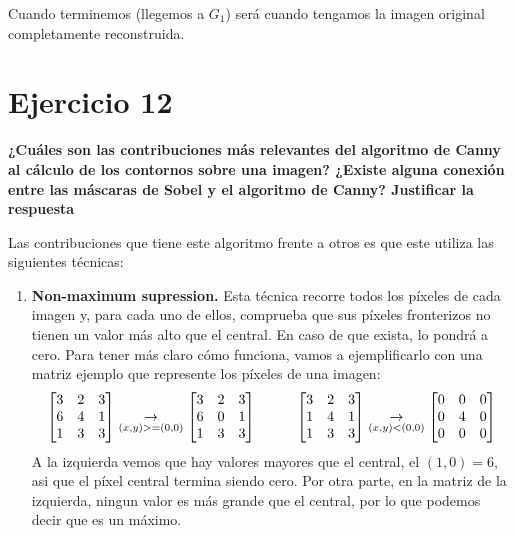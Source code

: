 \documentclass[11pt,a4paper]{article}
\begin{document}
Cuando terminemos (llegemos a $G_1$) será cuando tengamos la imagen original completamente reconstruida.

\section*{Ejercicio 12}

\textbf{¿Cuáles son las contribuciones más relevantes del algoritmo de Canny al cálculo de los contornos sobre una imagen? ¿Existe
alguna conexión entre las máscaras de Sobel y el algoritmo de Canny? Justificar la respuesta}

Las contribuciones que tiene este algoritmo frente a otros es que este utiliza las siguientes técnicas:
\begin{enumerate}
	\item \textbf{Non-maximum supression.} Esta técnica recorre todos los píxeles de cada imagen y, para cada uno de ellos, comprueba
	que sus píxeles fronterizos no tienen un valor más alto que el central. En caso de que exista, lo pondrá a cero. Para tener más
	claro cómo funciona, vamos a ejemplificarlo con una matriz ejemplo que represente los píxeles de una imagen:
	\begin{equation*}
		\begin{bmatrix}
		3& 2& 3\\ 
		6& 4& 1\\ 
		1& 3& 3
		\end{bmatrix}
		\underset{(x,y)>=(0,0)}{\rightarrow}
		\begin{bmatrix}
		3& 2& 3\\ 
		6& 0& 1\\ 
		1& 3& 3
		\end{bmatrix}
		\hspace{10mm}
		\begin{bmatrix}
		3& 2& 3\\ 
		1& 4& 1\\ 
		1& 3& 3
		\end{bmatrix}
		\underset{(x,y)<(0,0)}{\rightarrow}
		\begin{bmatrix}
		0& 0& 0\\ 
		0& 4& 0\\ 
		0& 0& 0
		\end{bmatrix}
	\end{equation*}
	A la izquierda vemos que hay valores mayores que el central, el $(1,0)=6$, asi que el píxel central termina siendo cero. Por otra parte, en
	la matriz de la izquierda, ningun valor es más grande que el central, por lo que podemos decir que es un máximo.


\end{enumerate}
\end{document}
